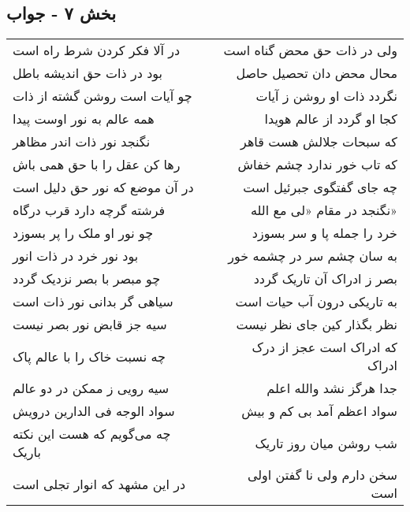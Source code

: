 \begin{center}
\section*{بخش ۷ - جواب}
\label{sec:sh007}
\begin{longtable}{l p{0.5cm} r}
در آلا فکر کردن شرط راه است
&&
ولی در ذات حق محض گناه است
\\
بود در ذات حق اندیشه باطل
&&
محال محض دان تحصیل حاصل
\\
چو آیات است روشن گشته از ذات
&&
نگردد ذات او روشن ز آیات
\\
همه عالم به نور اوست پیدا
&&
کجا او گردد از عالم هویدا
\\
نگنجد نور ذات اندر مظاهر
&&
که سبحات جلالش هست قاهر
\\
رها کن عقل را با حق همی باش
&&
که تاب خور ندارد چشم خفاش
\\
در آن موضع که نور حق دلیل است
&&
چه جای گفتگوی جبرئیل است
\\
فرشته گرچه دارد قرب درگاه
&&
نگنجد در مقام «لی مع الله»
\\
چو نور او ملک را پر بسوزد
&&
خرد را جمله پا و سر بسوزد
\\
بود نور خرد در ذات انور
&&
به سان چشم سر در چشمه خور
\\
چو مبصر با بصر نزدیک گردد
&&
بصر ز ادراک آن تاریک گردد
\\
سیاهی گر بدانی نور ذات است
&&
به تاریکی درون آب حیات است
\\
سیه جز قابض نور بصر نیست
&&
نظر بگذار کین جای نظر نیست
\\
چه نسبت خاک را با عالم پاک
&&
که ادراک است عجز از درک ادراک
\\
سیه رویی ز ممکن در دو عالم
&&
جدا هرگز نشد والله اعلم
\\
سواد الوجه فی الدارین درویش
&&
سواد اعظم آمد بی کم و بیش
\\
چه می‌گویم که هست این نکته باریک
&&
شب روشن میان روز تاریک
\\
در این مشهد که انوار تجلی است
&&
سخن دارم ولی نا گفتن اولی است
\\
\end{longtable}
\end{center}
